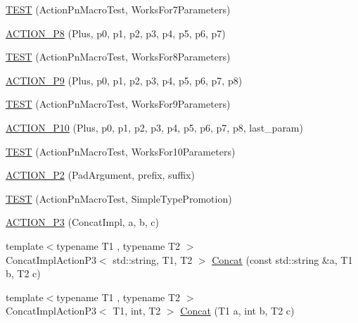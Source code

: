 \begin{DoxyCompactItemize}
\mbox{\hyperlink{namespacetesting_1_1gmock__generated__actions__test_add3cba52186c7ce384808c222492ee18}{T\+E\+ST}} (Action\+Pn\+Macro\+Test, Works\+For7\+Parameters)
\item 
\mbox{\hyperlink{namespacetesting_1_1gmock__generated__actions__test_ad8766a6dbaeffbf36658d3b5f75d3b00}{A\+C\+T\+I\+O\+N\+\_\+\+P8}} (Plus, p0, p1, p2, p3, p4, p5, p6, p7)
\item 
\mbox{\hyperlink{namespacetesting_1_1gmock__generated__actions__test_a1913bedf1d5cf736e91f2be119de0d5f}{T\+E\+ST}} (Action\+Pn\+Macro\+Test, Works\+For8\+Parameters)
\item 
\mbox{\hyperlink{namespacetesting_1_1gmock__generated__actions__test_ab023ad5e95ca2c2b8845963ce7222e00}{A\+C\+T\+I\+O\+N\+\_\+\+P9}} (Plus, p0, p1, p2, p3, p4, p5, p6, p7, p8)
\item 
\mbox{\hyperlink{namespacetesting_1_1gmock__generated__actions__test_a52d6dc447a4a71524adfeb7c8f7b6a68}{T\+E\+ST}} (Action\+Pn\+Macro\+Test, Works\+For9\+Parameters)
\item 
\mbox{\hyperlink{namespacetesting_1_1gmock__generated__actions__test_a3c6e7ef6aefc94efc9e815e92f0b3e47}{A\+C\+T\+I\+O\+N\+\_\+\+P10}} (Plus, p0, p1, p2, p3, p4, p5, p6, p7, p8, last\+\_\+param)
\item 
\mbox{\hyperlink{namespacetesting_1_1gmock__generated__actions__test_a564fd77344f58b26577452a380c93935}{T\+E\+ST}} (Action\+Pn\+Macro\+Test, Works\+For10\+Parameters)
\item 
\mbox{\hyperlink{namespacetesting_1_1gmock__generated__actions__test_ad58030fe83ad47cdb4ff027f8399adb4}{A\+C\+T\+I\+O\+N\+\_\+\+P2}} (Pad\+Argument, prefix, suffix)
\item 
\mbox{\hyperlink{namespacetesting_1_1gmock__generated__actions__test_ad42236ad6c6d01fad6dd947ca6163d59}{T\+E\+ST}} (Action\+Pn\+Macro\+Test, Simple\+Type\+Promotion)
\item 
\mbox{\hyperlink{namespacetesting_1_1gmock__generated__actions__test_ae46434959151b83249e52d4869e28cf0}{A\+C\+T\+I\+O\+N\+\_\+\+P3}} (Concat\+Impl, a, b, c)
\item 
{\footnotesize template$<$typename T1 , typename T2 $>$ }\\Concat\+Impl\+Action\+P3$<$ std\+::string, T1, T2 $>$ \mbox{\hyperlink{namespacetesting_1_1gmock__generated__actions__test_a28213583d5450876b564a3df58d1cf91}{Concat}} (const std\+::string \&a, T1 b, T2 c)
\item 
{\footnotesize template$<$typename T1 , typename T2 $>$ }\\Concat\+Impl\+Action\+P3$<$ T1, int, T2 $>$ \mbox{\hyperlink{namespacetesting_1_1gmock__generated__actions__test_a861e9fadbecf0c66e8226021c6c22013}{Concat}} (T1 a, int b, T2 c)

\end{DoxyCompactItemize}
